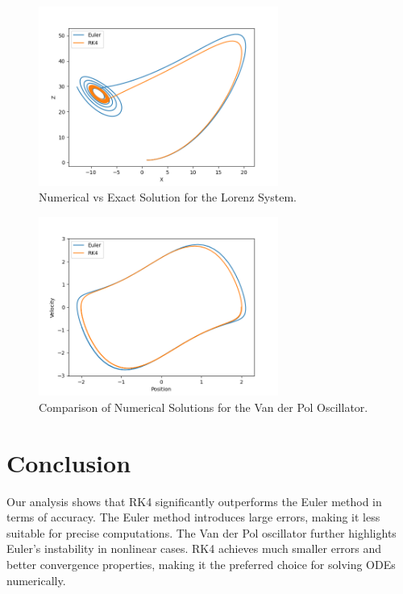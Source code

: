 \documentclass{article}
\begin{document}
\begin{center}
    \begin{figure}[htbp]
        \centering
        \includegraphics[width=0.7\textwidth]{results/figures/lorenz.png}
        \caption{Numerical vs Exact Solution for the Lorenz System.}
        \label{fig:lorenz}
    \end{figure}
    
    \begin{figure}[htbp]
        \centering
        \includegraphics[width=0.7\textwidth]{results/figures/vdp.png}
        \caption{Comparison of Numerical Solutions for the Van der Pol Oscillator.}
        \label{fig:vanderpol}
    \end{figure}
    \end{center}
    
    \clearpage  %
    
\section{Conclusion}
Our analysis shows that RK4 significantly outperforms the Euler method in terms of accuracy. The Euler method introduces large errors, making it less suitable for precise computations. The Van der Pol oscillator further highlights Euler’s instability in nonlinear cases. RK4 achieves much smaller errors and better convergence properties, making it the preferred choice for solving ODEs numerically.
\end{document}
